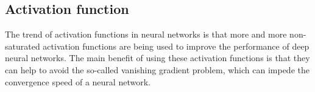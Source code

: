 %
%
%

\subsection{Activation function\label{activation_fn}}

The trend of activation functions in neural networks is that more and more non-saturated activation functions are being used to improve the performance of deep neural networks. The main benefit of using these activation functions is that they can help to avoid the so-called vanishing gradient problem, which can impede the convergence speed of a neural network.

